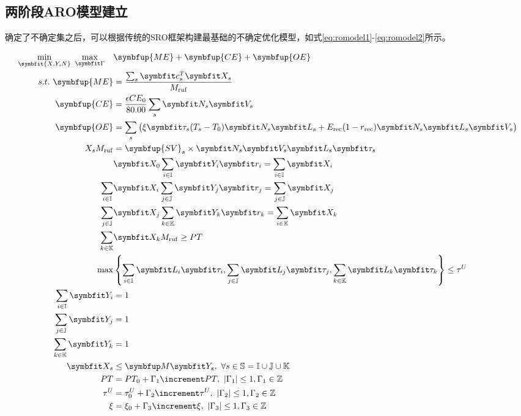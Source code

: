 \subsection{两阶段ARO模型建立}

确定了不确定集之后，可以根据传统的SRO框架构建最基础的不确定优化模型，如式\eqref{eq:romodel1}-\eqref{eq:romodel2}所示。

\begin{align}
  \min_{\symbfit{X,Y,N}}\ \max_{\symbfit \Gamma} \quad & \symbfup{ME} + \symbfup{CE} + \symbfup{OE} \label{eq:romodel1} \\
  s.t.\ \symbfup{ME} &= \frac{\sum_{s}\symbfit c_s^T\symbfit X_s}{M_{\rm ruf}} \\
   \symbfup{CE} &= \frac{\epsilon CE_0}{80.00}\sum_{s}\symbfit N_s\symbfit V_s \\
   \symbfup{OE} &= \sum_s \big(\xi\symbfit\tau_s(T_s-T_0)\symbfit N_s\symbfit L_s +E_{\rm rec}(1-r_{\rm rec})\symbfit N_s\symbfit L_s\symbfit V_s\big) \\
   X_sM_{\rm ruf} &= \symbfup{SV}_s\times\symbfit N_s\symbfit V_s\symbfit L_s\symbfit\tau_{s} \\
   &\symbfit X_0\sum_{i\in\mathbb I}\symbfit Y_i\symbfit r_i=\sum_{i\in\mathbb I}\symbfit X_i \\
  \sum_{i\in\mathbb I}&\symbfit X_i\sum_{j\in\mathbb J}\symbfit Y_j\symbfit r_j=\sum_{j\in\mathbb J}\symbfit X_j \\
  \sum_{j\in\mathbb J}&\symbfit X_j\sum_{k\in\mathbb K}\symbfit Y_k\symbfit r_k=\sum_{i\in\mathbb K}\symbfit X_k \\
  \sum_{k\in\mathbb K}&\symbfit X_kM_{\rm ruf}\ge PT \\
  \max&\left\{\sum_{i\in\mathbb I}\symbfit L_i\symbfit\tau_i,\sum_{j\in\mathbb J}\symbfit L_j\symbfit\tau_j,\sum_{k\in\mathbb K}\symbfit L_k\symbfit\tau_k\right\} \le \tau^U \\
  \sum_{i\in\mathbb I}\symbfit Y_i&=1  \\
  \sum_{j\in\mathbb J}\symbfit Y_j&=1 \\ 
  \sum_{k\in\mathbb K}\symbfit Y_k&=1 \\
  \symbfit X_s &\le \symbfup M\symbfit Y_s,\ \forall s\in \mathbb S = \mathbb I \cup\mathbb J\cup\mathbb K \\
  PT &= PT_0 + \Gamma_1\increment PT,\ |\Gamma_1|\le 1, \Gamma_1\in\mathbb Z \\
  \tau^U &= \tau_0^U + \Gamma_2\increment \tau^U,\ |\Gamma_2|\le 1, \Gamma_2\in\mathbb Z \\
  \xi &= \xi_0 + \Gamma_3\increment\xi,\ |\Gamma_3|\le 1, \Gamma_3\in\mathbb Z \label{eq:romodel2}
\end{align}

